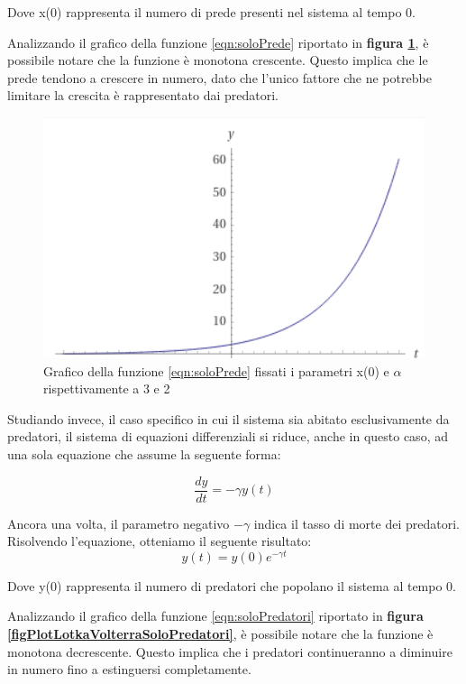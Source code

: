 \documentclass[11pt]{article}
\begin{document}
\noindent Dove x(0) rappresenta il numero di prede presenti nel sistema al tempo 0.

\noindent Analizzando il grafico della funzione \eqref{eqn:soloPrede} riportato in \textbf{figura \ref{figPlotLotkaVolterraSoloPrede}}, è possibile notare che la funzione è monotona crescente. Questo implica che le prede tendono a crescere in numero, dato che l'unico fattore che ne potrebbe limitare la crescita è rappresentato dai predatori. 

\begin{figure}[h]
    \centering
    \includegraphics[scale = 1]{plotSoloPrede.PNG}
    \caption{Grafico della funzione \eqref{eqn:soloPrede} fissati i parametri x(0) e $\alpha$ rispettivamente a 3 e 2}
    \label{figPlotLotkaVolterraSoloPrede}
\end{figure}

\noindent Studiando invece, il caso specifico in cui il sistema sia abitato esclusivamente da predatori, il sistema di equazioni differenziali si riduce, anche in questo caso, ad una sola equazione che assume la seguente forma: 

\[
    \frac{dy}{dt} = -\gamma y(t) 
\]

Ancora una volta, il parametro negativo $-\gamma$ indica il tasso di morte dei predatori. 
Risolvendo l'equazione, otteniamo il seguente risultato:
\begin{equation}\label{eqn:soloPredatori}
    y(t) = y(0)e^{-\gamma t}
\end{equation}

\noindent Dove y(0) rappresenta il numero di predatori che popolano il sistema al tempo 0.

\noindent Analizzando il grafico della funzione \eqref{eqn:soloPredatori} riportato in \textbf{figura \ref{figPlotLotkaVolterraSoloPredatori}}, è possibile notare che la funzione è monotona decrescente. Questo implica che i predatori continueranno a diminuire in numero fino a estinguersi completamente. 
\end{document}
